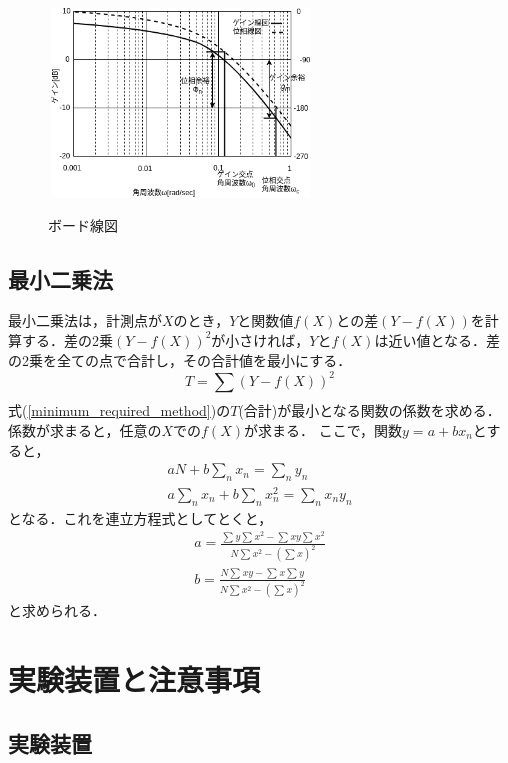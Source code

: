 \documentclass[12pt]{jsarticle}
\begin{document}
\begin{figure}[tb]
  \begin{center}
    \label{Bode-Diagram}
    \includegraphics[clip, width=7.0cm, height=5.0cm]{../img/Fig2-A4.png}
    \caption{ボード線図}
  \end{center}
\end{figure}

\subsection{最小二乗法}
最小二乗法は，計測点が$X$のとき，$Y$と関数値$f(X)$との差$(Y-f(X))$を計算する．差の2乗$(Y-f(X))^2$が小さければ，$Y$と$f(X)$は近い値となる．差の2乗を全ての点で合計し，その合計値を最小にする．
\begin{equation}
  \label{minimum_required_method}
  T = \sum_{}^{}(Y-f(X))^2
\end{equation}
式(\ref{minimum_required_method})の$T$(合計)が最小となる関数の係数を求める．係数が求まると，任意の$X$での$f(X)$が求まる\cite{minimum_method}．
ここで，関数$y = a + bx_n$とすると，
\begin{eqnarray}
  \label{minimum_method}
  aN + b\sum_{n}^{}x_n = \sum_{n}^{}y_n \\
  a\sum_{n}^{}x_n + b\sum_{n}^{}x_n^2 = \sum_{n}^{}x_ny_n
\end{eqnarray}
となる．これを連立方程式としてとくと，
\begin{eqnarray}
a = \frac{\sum{}^{}y \sum{}^{}x^2 - \sum{}^{}xy\sum{}^{}x^2}{N\sum_{}^{}x^2 - (\sum_{}^{}x)^2}\\
b = \frac{N\sum{}^{}xy - \sum{}^{}x\sum{}^{}y}{N\sum_{}^{}x^2 - (\sum_{}^{}x)^2}
\end{eqnarray}
と求められる．

\section{実験装置と注意事項}
\subsection{実験装置}
\end{document}
